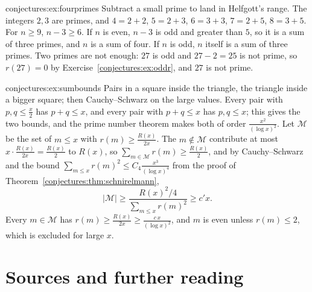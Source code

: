 \begin{solution}{conjectures:ex:fourprimes}
\idea Subtract a small prime to land in Helfgott's range.
\writeup The integers $2,3$ are primes, and $4=2+2$, $5=2+3$, $6=3+3$, $7=2+5$, $8=3+5$. For $n\ge9$, $n-3\ge6$. If $n$ is even, $n-3$ is odd and greater than
$5$, so it is a sum of three primes, and $n$ is a sum of four. If $n$ is odd, $n$ itself is a sum of three primes. Two primes are not enough: $27$ is odd and
$27-2=25$ is not prime, so $r(27)=0$ by Exercise~\ref{conjectures:ex:oddr}, and $27$ is not prime.
\end{solution}

\begin{solution}{conjectures:ex:sumbounds}
\idea Pairs in a square inside the triangle, the triangle inside a bigger square; then Cauchy--Schwarz on the large values.
\writeup Every pair with $p,q\le\frac x2$ has $p+q\le x$, and every pair with $p+q\le x$ has $p,q\le x$; this gives the two bounds, and the prime number theorem
makes both of order $\frac{x^2}{(\log x)^2}$. Let $\mathcal M$ be the set of $m\le x$ with $r(m)\ge\frac{R(x)}{2x}$. The $m\notin\mathcal M$ contribute at most
$x\cdot\frac{R(x)}{2x}=\frac{R(x)}2$ to $R(x)$, so $\sum_{m\in\mathcal M}r(m)\ge\frac{R(x)}2$, and by Cauchy--Schwarz and the bound
$\sum_{m\le x}r(m)^2\le C_4\frac{x^3}{(\log x)^4}$ from the proof of Theorem~\ref{conjectures:thm:schnirelmann},
\[
|\mathcal M|\ge\frac{R(x)^2/4}{\sum_{m\le x}r(m)^2}\ge c'x.
\]
Every $m\in\mathcal M$ has $r(m)\ge\frac{R(x)}{2x}\ge\frac{c\,x}{(\log x)^2}$, and $m$ is even unless $r(m)\le2$, which is excluded for large $x$.
\end{solution}

\section*{Sources and further reading}

